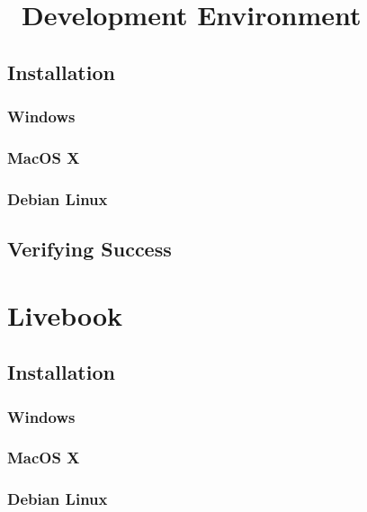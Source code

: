 \section{\csharp\ Development Environment}

\subsection{Installation}
\subsubsection{Windows}
\subsubsection{MacOS X}
\subsubsection{Debian Linux}
\subsection{Verifying Success}

\section{Livebook}

\subsection{Installation}
\subsubsection{Windows}
\subsubsection{MacOS X}
\subsubsection{Debian Linux}



